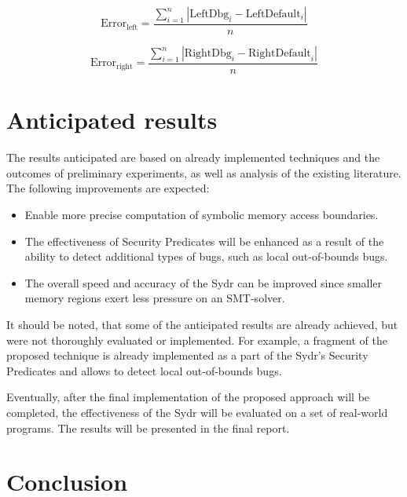 \documentclass[conference]{IEEEtran}
\begin{document}
\begin{equation}
    \text{Error}_\text{left}=\frac{\sum_{i=1}^n{|\text{LeftDbg}_i-\text{LeftDefault}_i|}}{n}
\end{equation}

\begin{equation}
    \text{Error}_\text{right}=\frac{\sum_{i=1}^n{|\text{RightDbg}_i-\text{RightDefault}_i|}}{n}
\end{equation}


\section{Anticipated results}

The results anticipated are based on already implemented techniques and the outcomes of preliminary experiments, as well as analysis of the existing literature. The following improvements are expected:

\begin{itemize}
    \item Enable more precise computation of symbolic memory access boundaries.
    \item The effectiveness of Security Predicates will be enhanced as a result of the ability to detect additional types of bugs, such as local out-of-bounds bugs.
    \item The overall speed and accuracy of the Sydr can be improved since smaller memory regions exert less pressure on an SMT-solver.
\end{itemize}

It should be noted, that some of the anticipated results are already achieved, but were not thoroughly evaluated or implemented. For example, a fragment of the proposed technique is already implemented as a part of the Sydr's Security Predicates and allows to detect local out-of-bounds bugs.

Eventually, after the final implementation of the proposed approach will be completed, the effectiveness of the Sydr will be evaluated on a set of real-world programs. The results will be presented in the final report.


\section{Conclusion}
\end{document}
